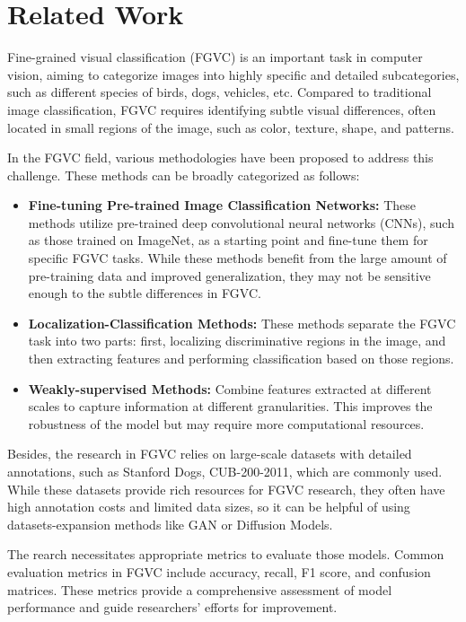 \section{Related Work}
\label{sec:related_work}

Fine-grained visual classification (FGVC) is an important task in computer vision, aiming to categorize images into highly specific and detailed subcategories, such as different species of birds, dogs, vehicles, etc. Compared to traditional image classification, FGVC requires identifying subtle visual differences, often located in small regions of the image, such as color, texture, shape, and patterns.

In the FGVC field, various methodologies have been proposed to address this challenge. These methods can be broadly categorized as follows:
\begin{itemize}
    \item \textbf{Fine-tuning Pre-trained Image Classification Networks:} These methods utilize pre-trained deep convolutional neural networks (CNNs), such as those trained on ImageNet, as a starting point and fine-tune them for specific FGVC tasks. While these methods benefit from the large amount of pre-training data and improved generalization, they may not be sensitive enough to the subtle differences in FGVC.
    \item \textbf{Localization-Classification Methods:} These methods separate the FGVC task into two parts: first, localizing discriminative regions in the image, and then extracting features and performing classification based on those regions.
    \item \textbf{Weakly-supervised Methods:} Combine features extracted at different scales to capture information at different granularities. This improves the robustness of the model but may require more computational resources.
\end{itemize}

Besides, the research in FGVC relies on large-scale datasets with detailed annotations, such as Stanford Dogs, CUB-200-2011, which are commonly used. While these datasets provide rich resources for FGVC research, they often have high annotation costs and limited data sizes, so it can be helpful of using datasets-expansion methods like GAN or Diffusion Models. 

The rearch necessitates appropriate metrics to evaluate those models. Common evaluation metrics in FGVC include accuracy, recall, F1 score, and confusion matrices. These metrics provide a comprehensive assessment of model performance and guide researchers' efforts for improvement.

